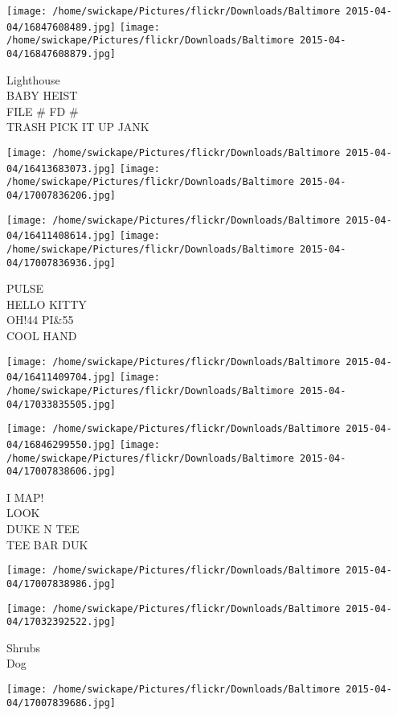 \documentclass[10pt,letterpaper]{article}
\begin{document}
\texttt{[image: /home/swickape/Pictures/flickr/Downloads/Baltimore 2015-04-04/16847608489.jpg]}
\texttt{[image: /home/swickape/Pictures/flickr/Downloads/Baltimore 2015-04-04/16847608879.jpg]}

Lighthouse\\
BABY HEIST\\
FILE \# FD \#\\
TRASH PICK IT UP JANK
\pagebreak

\texttt{[image: /home/swickape/Pictures/flickr/Downloads/Baltimore 2015-04-04/16413683073.jpg]}
\texttt{[image: /home/swickape/Pictures/flickr/Downloads/Baltimore 2015-04-04/17007836206.jpg]}

\texttt{[image: /home/swickape/Pictures/flickr/Downloads/Baltimore 2015-04-04/16411408614.jpg]}
\texttt{[image: /home/swickape/Pictures/flickr/Downloads/Baltimore 2015-04-04/17007836936.jpg]}

PULSE\\
HELLO KITTY\\
OH!44 PI\&55\\
COOL HAND
\pagebreak

\texttt{[image: /home/swickape/Pictures/flickr/Downloads/Baltimore 2015-04-04/16411409704.jpg]}
\texttt{[image: /home/swickape/Pictures/flickr/Downloads/Baltimore 2015-04-04/17033835505.jpg]}

\texttt{[image: /home/swickape/Pictures/flickr/Downloads/Baltimore 2015-04-04/16846299550.jpg]}
\texttt{[image: /home/swickape/Pictures/flickr/Downloads/Baltimore 2015-04-04/17007838606.jpg]}

I MAP!\\
LOOK\\
DUKE N TEE\\
TEE BAR DUK
\pagebreak

\texttt{[image: /home/swickape/Pictures/flickr/Downloads/Baltimore 2015-04-04/17007838986.jpg]}

\vspace{0.25in}
\texttt{[image: /home/swickape/Pictures/flickr/Downloads/Baltimore 2015-04-04/17032392522.jpg]}

Shrubs\\
Dog
\pagebreak

\texttt{[image: /home/swickape/Pictures/flickr/Downloads/Baltimore 2015-04-04/17007839686.jpg]}
\end{document}

